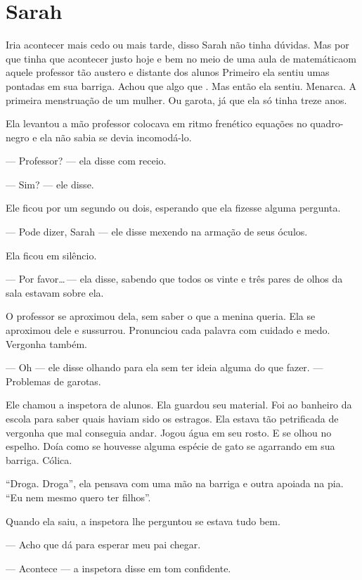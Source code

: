 \chapter{Sarah}

Iria acontecer mais cedo ou mais tarde, disso Sarah não tinha dúvidas. Mas por que tinha que acontecer justo hoje e bem no meio de uma aula de matemáticaom aquele professor tão austero e distante dos alunos Primeiro ela sentiu umas pontadas em sua barriga. Achou que  algo que . Mas então ela sentiu. Menarca. A primeira menstruação de um mulher. Ou garota, já que ela só tinha treze anos.

Ela levantou a mão professor colocava em ritmo frenético equações no quadro-negro e ela não sabia se devia incomodá-lo.

--- Professor? --- ela disse com receio.

--- Sim? --- ele disse.

Ele ficou  por um segundo ou dois, esperando que ela fizesse alguma pergunta.

--- Pode dizer, Sarah --- ele disse\mudanca{,} mexendo na armação de seus óculos.

Ela ficou em silêncio.

--- Por favor\ldots\,--- ela disse, sabendo que todos os vinte e três pares de olhos da sala estavam sobre ela.

O professor se aproximou dela, sem saber o que a menina queria. Ela se aproximou dele e sussurrou. Pronunciou cada palavra com cuidado e medo. Vergonha também.

--- Oh --- ele disse\mudanca{,} olhando para ela sem ter ideia alguma do que fazer. --- Problemas de garotas.

Ele chamou a inspetora de alunos. Ela guardou seu material. Foi ao banheiro da escola para saber quais haviam sido os estragos. Ela estava tão petrificada de vergonha que mal conseguia andar. Jogou água em seu rosto. E se olhou no espelho. Doía como se houvesse alguma espécie de gato se agarrando em sua barriga. Cólica.

``Droga. Droga'', ela pensava com uma mão na barriga e outra apoiada na pia. ``Eu nem mesmo quero ter filhos''.

Quando ela saiu, a inspetora lhe perguntou se estava tudo bem.

--- Acho que dá para esperar meu pai chegar.

--- Acontece --- a inspetora disse em tom confidente.

